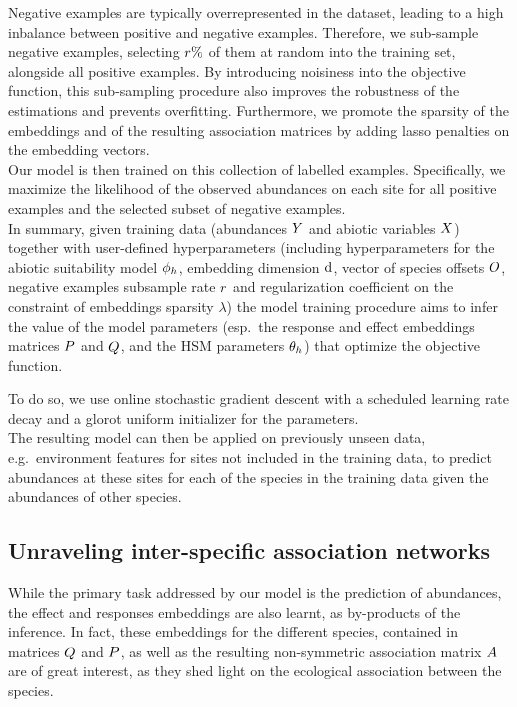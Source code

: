 \documentclass[10pt,a4paper]{article}
\begin{document}
Negative examples are typically overrepresented in the dataset, leading to a high inbalance between positive and negative examples. Therefore, we sub-sample negative examples, selecting $r \%$ of them at random into the training set, alongside all positive examples. By introducing noisiness into the objective function, this sub-sampling procedure also improves the robustness of the estimations and prevents overfitting. Furthermore, we promote the sparsity of the embeddings and of the resulting association matrices by adding lasso penalties on the embedding vectors. \\

Our model is then trained on this collection of labelled examples. Specifically, we maximize the likelihood of the observed abundances on each site for all positive examples and the selected subset of negative examples. \\

In summary, given training data (abundances $Y$ and abiotic variables $X$) together with user-defined hyperparameters (including hyperparameters for the abiotic suitability model $\phi_h$, embedding dimension $\operatorname{d}$, vector of species offsets $O$, negative examples subsample rate $r$ and regularization coefficient on the constraint of embeddings sparsity $\lambda$) the model training procedure aims to infer the value of the model parameters (esp.\ the response and effect embeddings matrices $P$ and $Q$, and the HSM parameters $\theta_h$) that optimize the objective function. 

To do so, we use online stochastic gradient descent with a scheduled learning rate decay and a glorot uniform initializer for the parameters.\\

The resulting model can then be applied on previously unseen data, e.g.\ environment features for sites not included in the training data, to predict abundances at these sites for each of the species in the training data given the abundances of other species.

\subsection{Unraveling inter-specific association networks}
While the primary task addressed by our model is the prediction of abundances, the effect and responses embeddings are also learnt, as by-products of the inference. In fact, these embeddings for the different species, contained in matrices $Q$ and $P$, as well as the resulting non-symmetric association matrix $A$ are of great interest, as they shed light on the ecological association between the species. \\
\end{document}
